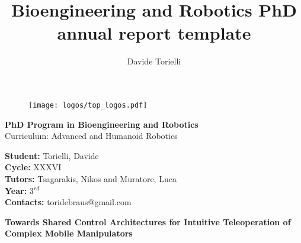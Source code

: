 \documentclass[11pt,a4paper]{article}
\author{Davide Torielli}
\title{Bioengineering and Robotics PhD annual report template}
\begin{document}
\begin{figure}[t]
	\centering
	\texttt{[image: logos/top\_logos.pdf]}
\end{figure}
\hphantom{h}\vspace{1.3cm}


\begin{center}
	
\LARGE{\textbf{PhD Program in Bioengineering and Robotics}\vspace{0.4cm}\\
Curriculum: Advanced and Humanoid Robotics}

\end{center}

\begin{flushleft}
\vspace{1.5cm}
\large{\textbf{Student: }}\large{{Torielli, Davide}}\vspace{0.2cm}\\
\large{\textbf{Cycle: }}\large{XXXVI}\vspace{0.2cm}\\
\large{\textbf{Tutors: }}\large{{Tsagarakis, Nikos and Muratore, Luca}}\vspace{0.2cm}\\
\large{\textbf{Year: }}\large{3$^{rd}$}\vspace{0.2cm}\\
\large{\textbf{Contacts: }}\large{{toridebraus@gmail.com}}
\end{flushleft}
\clearpage
\begin{center}
	\textbf{\normalsize{Towards Shared Control Architectures ​for Intuitive Teleoperation of Complex Mobile Manipulators}}
\end{center}









\cleardoublepage

%
%
\printbibliography[notcategory=dontbib]
\end{document}
